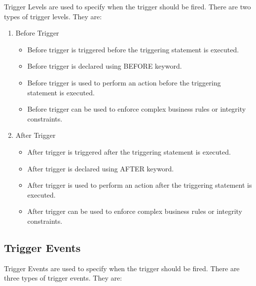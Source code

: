\documentclass[11pt]{article}
\begin{document}
Trigger Levels are used to specify when the trigger should be fired. There are two types of trigger levels. They are:
\begin{enumerate}
    \item Before Trigger
          \begin{itemize}
              \item Before trigger is triggered before the triggering statement is executed.
              \item Before trigger is declared using BEFORE keyword.
              \item Before trigger is used to perform an action before the triggering statement is executed.
              \item Before trigger can be used to enforce complex business rules or integrity constraints.
          \end{itemize}

    \item After Trigger
          \begin{itemize}
              \item After trigger is triggered after the triggering statement is executed.
              \item After trigger is declared using AFTER keyword.
              \item After trigger is used to perform an action after the triggering statement is executed.
              \item After trigger can be used to enforce complex business rules or integrity constraints.
          \end{itemize}
        
\end{enumerate}

\subsection{Trigger Events}

Trigger Events are used to specify when the trigger should be fired. There are three types of trigger events. They are:
\end{document}
